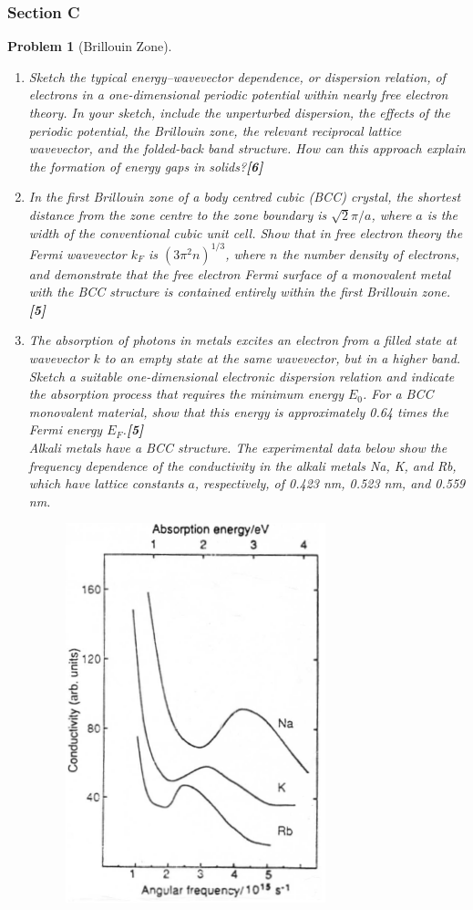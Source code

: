 \documentclass[a4paper]{article}
\theoremstyle{new}
\newtheorem{qns}{Problem}[subsection]
\begin{document}
\subsubsection{Section C}
\begin{qns}[Brillouin Zone]\leavevmode
\begin{enumerate}[label=(\roman*)]
\item Sketch the typical energy–wavevector dependence, or dispersion relation, of electrons in a one-dimensional periodic potential within nearly free electron theory. In your sketch, include the unperturbed dispersion, the effects of the periodic potential, the Brillouin zone, the relevant reciprocal lattice wavevector, and the folded-back band structure. How can this approach explain the formation of energy gaps in solids?\hfill\textbf{[6]}
\item In the first Brillouin zone of a body centred cubic (BCC) crystal, the shortest distance from the zone centre to the zone boundary is $\sqrt{2}\pi/a$, where $a$ is the width of the conventional cubic unit cell. Show that in free electron theory the Fermi wavevector $k_F$ is $(3\pi^2n)^{1/3}$, where $n$ the number density of electrons, and demonstrate that the free electron Fermi surface of a monovalent metal with the BCC structure is contained entirely within the first Brillouin zone.\hfill\textbf{[5]}
\item The absorption of photons in metals excites an electron from a filled state at wavevector $k$ to an empty state at the same wavevector, but in a higher band. Sketch a suitable one-dimensional electronic dispersion relation and indicate the absorption process that requires the minimum energy $E_0$. For a BCC monovalent material, show that this energy is approximately 0.64 times the Fermi energy $E_F$.\hfill\textbf{[5]}\\[5pt]
Alkali metals have a BCC structure. The experimental data below show the frequency dependence of the conductivity in the alkali metals Na, K, and Rb, which have lattice constants $a$, respectively, of 0.423 nm, 0.523 nm, and 0.559 nm.
\begin{figure}[H]
    \centering
    \includegraphics[scale=0.65]{2010P1C10Q.PNG}

\end{figure}
\end{enumerate}
\end{qns}
\end{document}
